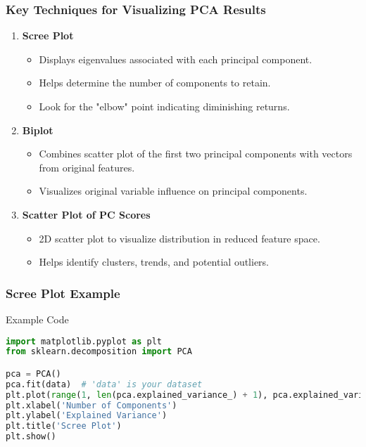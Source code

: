 \documentclass[aspectratio=169]{beamer}
\begin{document}
\begin{frame}[fragile]
    \frametitle{Key Techniques for Visualizing PCA Results}
    \begin{enumerate}
        \item \textbf{Scree Plot}
        \begin{itemize}
            \item Displays eigenvalues associated with each principal component.
            \item Helps determine the number of components to retain.
            \item Look for the "elbow" point indicating diminishing returns.
        \end{itemize}
        
        \item \textbf{Biplot}
        \begin{itemize}
            \item Combines scatter plot of the first two principal components with vectors from original features.
            \item Visualizes original variable influence on principal components.
        \end{itemize}
        
        \item \textbf{Scatter Plot of PC Scores}
        \begin{itemize}
            \item 2D scatter plot to visualize distribution in reduced feature space.
            \item Helps identify clusters, trends, and potential outliers.
        \end{itemize}
    \end{enumerate}
\end{frame}

\begin{frame}[fragile]
    \frametitle{Scree Plot Example}
    \begin{block}{Example Code}
    \begin{lstlisting}[language=Python]
import matplotlib.pyplot as plt
from sklearn.decomposition import PCA

pca = PCA()
pca.fit(data)  # 'data' is your dataset
plt.plot(range(1, len(pca.explained_variance_) + 1), pca.explained_variance_)
plt.xlabel('Number of Components')
plt.ylabel('Explained Variance')
plt.title('Scree Plot')
plt.show()
    \end{lstlisting}
    \end{block}
\end{frame}
\end{document}
